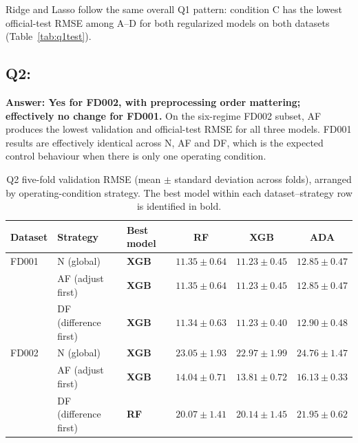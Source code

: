 \documentclass[10pt,a4paper]{article}
\begin{document}
Ridge and Lasso follow the same overall Q1 pattern: condition C has the lowest official-test RMSE among A--D for both regularized models on both datasets (Table~\ref{tab:q1test}).

\subsection{Q2:}
\textbf{Answer: Yes for FD002, with preprocessing order mattering; effectively no change for FD001.} On the six-regime FD002 subset, AF produces the lowest validation and official-test RMSE for all three models. FD001 results are effectively identical across N, AF and DF, which is the expected control behaviour when there is only one operating condition.



\begin{table}[H]\centering\small
\caption{Q2 five-fold validation RMSE (mean $\pm$ standard deviation across folds), arranged by operating-condition strategy. The best model within each dataset--strategy row is identified in bold.}\label{tab:q2cv}
\begin{tabular}{ll lccc}\toprule
Dataset & Strategy & Best model & RF & XGB & ADA\\\midrule
FD001 & N (global) & \textbf{XGB} & $11.35\pm0.64$ & $\mathbf{11.23\pm0.45}$ & $12.85\pm0.47$\\
 & AF (adjust first) & \textbf{XGB} & $11.35\pm0.64$ & $\mathbf{11.23\pm0.45}$ & $12.85\pm0.47$\\
 & DF (difference first) & \textbf{XGB} & $11.34\pm0.63$ & $\mathbf{11.23\pm0.40}$ & $12.90\pm0.48$\\\midrule
FD002 & N (global) & \textbf{XGB} & $23.05\pm1.93$ & $\mathbf{22.97\pm1.99}$ & $24.76\pm1.47$\\
 & AF (adjust first) & \textbf{XGB} & $14.04\pm0.71$ & $\mathbf{13.81\pm0.72}$ & $16.13\pm0.33$\\
 & DF (difference first) & \textbf{RF} & $\mathbf{20.07\pm1.41}$ & $20.14\pm1.45$ & $21.95\pm0.62$\\\bottomrule
\end{tabular}
\end{table}
\end{document}
